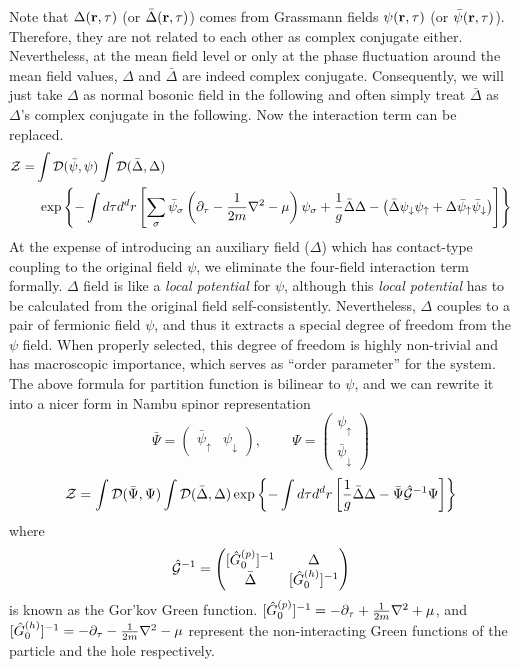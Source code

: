 Note that  $\Delta(\mathbf{r},\tau)$ (or $\bar\Delta(\mathbf{r},\tau)$) comes from  Grassmann fields $\psi(\mathbf{r},\tau)$ (or $\bar\psi(\mathbf{r},\tau)$). Therefore, they are not related to each other as complex conjugate either.  Nevertheless, at the mean field level or only at the phase fluctuation around the mean field values, $\Delta$  and $\bar\Delta$ are indeed complex conjugate.  Consequently, we will just take $\Delta$  as normal bosonic field in the following and often simply treat $\bar\Delta$ as $\Delta$'s complex conjugate in the following. Now the interaction term can be replaced.
\begin{align*}
\mathcal{Z}=&\int{}\mathcal{D}(\bar\psi,\psi)\int{\ensuremath{\mathcal{D}}(\bar\Delta,\Delta)}\\
&\;\exp\left\{-\int{d\tau{d^{d}r}}\left[\sum_{\sigma}\bar\psi_{\sigma}\left(\partial_{\tau}-\frac{1}{2m}\nabla^{2}-\mu\right)\psi_{\sigma}+\frac{1}{g}{\bar\Delta}{\Delta}-\left(\bar\Delta\psi_{\downarrow}\psi_{\uparrow}+\Delta\bar\psi_{\uparrow}\bar\psi_{\downarrow}\right)\right]\right\}
\end{align*}
At the expense of introducing an auxiliary field ($\Delta$) which has contact-type coupling to the original field $\psi$, we eliminate the four-field interaction term formally.  $\Delta$ field is like a \emph{local potential} for $\psi$, although this \emph{local potential} has to be calculated from the original field self-consistently.  Nevertheless, $\Delta$ couples to a pair of fermionic field $\psi$, and thus it extracts a special degree of freedom from the $\psi$ field.  When properly selected, this degree of freedom is highly non-trivial and has macroscopic importance, which serves as ``order parameter'' for the system.  The above formula for partition function is bilinear to $\psi$, and we can rewrite it into a nicer form in Nambu spinor representation
\begin{equation}
\bar\Psi=\begin{pmatrix}\bar{\psi}_{\uparrow}&\psi_{\downarrow}\end{pmatrix}\text{,  }\qquad
\Psi=\begin{pmatrix}{\psi}_{\uparrow}\\\bar\psi_{\downarrow}\end{pmatrix}
\end{equation}
\begin{equation}\label{eq:pathInt:ZDeltaPhi}
\mathcal{Z}=\int{\ensuremath{\mathcal{D}}(\bar\Psi,\Psi)}\int{\ensuremath{\mathcal{D}}(\bar\Delta,\Delta)}\exp
	\left\{-\int{d\tau{d^{d}r}}\left[\frac{1}{g}{\bar\Delta}{\Delta}-\bar\Psi \hat{\mathcal{G}}^{-1}\Psi\right]\right\}
\end{equation}
where 
\begin{equation}\label{eq:pathInt:nG}
\hat{\mathcal{G}}^{-1}=\begin{pmatrix}
[\hat{G}_{0}^{(p)}]^{-1}&\Delta\\\bar\Delta&[\hat{G}_{0}^{(h)}]^{-1}
\end{pmatrix}
\end{equation}
is known as the Gor'kov Green function. $[\hat{G}_{0}^{(p)}]^{-1}=-\partial_{\tau}+\frac{1}{2m}\nabla^{2}+\mu$, and $[\hat{G}_{0}^{(h)}]^{-1}=-\partial_{\tau}-\frac{1}{2m}\nabla^{2}-\mu$ represent the non-interacting Green functions of the particle and the hole respectively. 

